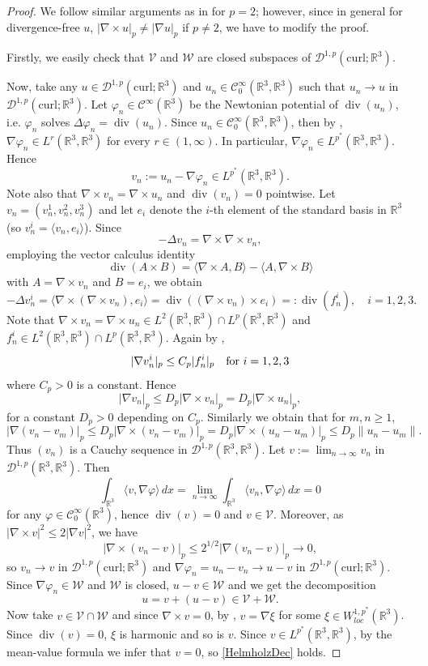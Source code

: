 \documentclass[12pt,leqno,twoside]{amsart}
\newcommand{\vp}{\varphi}
\def\div{\mathop{\mathrm{div}}}
\def\R{\mathbb{R}}
\def\curl{\mathrm{curl}}
\def\V{\mathcal{V}}
\def\Wc{\mathscr{W}}
\def\W{\mathcal{W}}
\newcommand{\cC}{{\mathcal C}}
\newcommand{\cD}{{\mathcal D}}
\newcommand{\cDp}{\cD^{1,p}(\R^3,\R^3)}
\newcommand{\cV}{{\mathcal V}}
\newcommand{\cW}{{\mathcal W}}
\def\r{\mathbb{R}}
\def\r3{\mathbb{R}^3}
\def\Wc{\cD^{1,p}(\curl;\R^3)}
\def\vp{\varphi}
\def\curlop{\nabla\times}
\numberwithin{equation}{section}
\begin{document}
\begin{proof} 
We follow similar arguments as in \cite[Lemma 2.4]{MSchSz} for $p=2$; however, since in general for divergence-free $u$, $|\curlop u|_p\neq |\nabla u|_p$ if $p\neq 2$, we have to modify the proof.
 
 Firstly, we easily check that $\V$ and $\cW$ are closed subspaces of $\Wc$.
	 
Now, take any $u\in \Wc$ and $u_n\in\cC_0^{\infty}(\R^3,\R^3)$ such that $u_n\to u$ in $\Wc$. Let $\vp_n\in\cC^{\infty}(\R^3)$ be the Newtonian potential of $\div(u_n)$, i.e. $\vp_n$ solves $\Delta \vp_n = \div(u_n)$.  Since $u_n\in\cC_0^{\infty}(\R^3,\R^3)$, then by \cite[Proposition 1]{Iwaniec}, $\nabla \vp_n\in L^r(\R^3,\R^3)$ for every $r\in(1,\infty)$. In particular, $\nabla\vp_n\in L^{p^*}(\R^3,\R^3)$. 
Hence
$$	v_n:=u_n-\nabla \vp_n\in  L^{p^*}(\R^3,\R^3).
	$$ 
	Note also that  $\curlop v_n = \curlop u_n$  and $\div(v_n)=0$ pointwise. Let $v_n=(v_n^1,v_n^2,v_n^3)$ and let $e_i$ denote the $i$-th element of the standard basis in $\r3$ (so $v_n^i = \langle v_n,e_i\rangle$). Since
$$-\Delta  v_n=\curlop \curlop v_n,$$
employing the vector calculus identity
\[
\div(A\times B) = \langle \curlop A, B\rangle - \langle A,\curlop B\rangle
\] 
with $A = \curlop v_n$ and $B=e_i$, we obtain
\[
-\Delta v_n^i = \langle \curlop(\curlop v_n), e_i\rangle = \div((\curlop v_n)\times e_i) =: \div(f_n^i), \quad i=1,2,3. 
\]
Note that $\curlop v_n = \curlop u_n\in L^2(\R^3,\R^3)\cap L^p(\R^3,\R^3)$ and
$f_n^i\in L^2(\R^3,\R^3)\cap L^p(\R^3,\R^3)$. Again  by \cite[Proposition 1]{Iwaniec}, 
	$$|\nabla v_n^i|_p\leq C_p|f_n^i|_p \quad\hbox{for }i=1,2,3$$
where $C_p>0$ is a constant.
Hence 
\begin{equation}\label{eqes3C}
|\nabla v_n|_p\leq D_p |\curlop v_n|_p = D_p |\curlop u_n|_p,
\end{equation}
for a constant $D_p>0$ depending on $C_p$.
Similarly we obtain that for $m,n\ge 1$,
	$$|\nabla(v_n-v_m)|_{p}\leq D_p|\curlop(v_n-v_m)|_{p}=D_p|\curlop(u_n-u_m)|_{p}\leq D_p \|u_n-u_m\|.$$
	Thus $(v_n)$ is a Cauchy sequence in $\cDp$. Let $v:=\lim_{n\to\infty}v_n$ in $\cDp$. Then
	$$\int_{\R^3}\langle v,\nabla \vp\rangle\,dx=\lim_{n\to\infty}\int_{\R^3}\langle v_n,\nabla \vp\rangle\,dx=0$$
	for any $\vp\in\cC_0^{\infty}(\R^3)$, hence $\div(v) =0$ and $v\in\cV$.
	Moreover, as $|\curlop v|^2 \le 2|\nabla v|^2$, we have 
	\begin{equation} \label{ineq5}
	|\curlop(v_n-v)|_{p}\leq 2^{1/2}|\nabla(v_n-v)|_{p}\to 0,
	\end{equation}
	so $v_n\to v$ in  $\Wc$ and
	$\nabla \vp_n=u_n-v_n\to u-v$ in $\Wc$. Since $\nabla\vp_n\in\cW$ and $\cW$ is closed,
	$u-v\in \cW$ and we get the decomposition
	$$u=v+(u-v)\in \cV+\cW.$$
	\indent Now take $v\in \cV\cap\W$ and since $\curlop v =0$,
	 by \cite[Lemma 1.1(i)]{Le}, $v=\nabla\xi$ for some $\xi\in W^{1,{p^*}}_{loc}(\R^3)$. Since $\div(v) = 0$, $\xi$ is harmonic and so is $v$. Since $v\in L^{p^*}(\R^3,\R^3)$, by the mean-value formula we infer that $v=0$, so \eqref{HelmholzDec} holds.


\end{proof}
\end{document}
